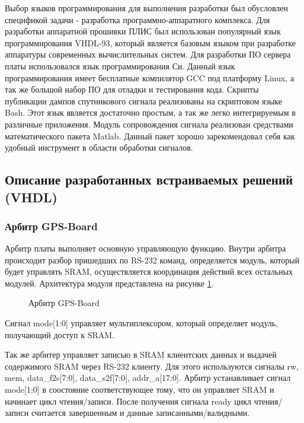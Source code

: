 Выбор языков программирования для выполнения разработки был обусловлен спецификой задачи - разработка программно-аппаратного комплекса.
Для разработки аппаратной прошивки ПЛИС был использован популярный язык программирования VHDL-93, который является базовым языком
при разработке аппаратуры современных вычислительных систем. Для разработки ПО сервера платы использовался язык программирования Си.
Данный язык программирования имеет бесплатные компилятор GCC под платформу Linux, а так же большой набор ПО для отладки и тестирования кода.
Скрипты публикации дампов спутникового сигнала реализованы на скриптовом языке Bash. Этот язык является достаточно простым, а так же
легко интегрируемым в различные приложения.
Модуль сопровождения сигнала реализован средствами математического пакета Matlab. Данный пакет хорошо зарекомендовал себя как удобный инструмент
в области обработки сигналов.

\subsection{Описание разработанных встраиваемых решений (VHDL)}
\subsubsection*{Арбитр GPS-Board}
Арбитр платы выполняет основную управляющую функцию. Внутри арбитра происходит разбор пришедших по RS-232 команд, определяется
модуль, который будет управлять SRAM, осуществляется координация действий всех остальных модулей. Архитектура модуля представлена на
рисунке \ref{pic:arbiter_arch}.

\begin{figure}[h]
\begin{center}
\end{center}
\caption{Арбитр GPS-Board}
\label{pic:arbiter_arch}
\end{figure}

Сигнал mode[1:0] управляет мультиплексором, который определяет модуль, получающий доступ к SRAM. 

Так же арбитер управляет записью в SRAM клиентских данных и выдачей содержимого SRAM через RS-232 клиенту. Для этого используются
сигналы rw, mem, data\_f2s[7:0], data\_s2f[7:0], addr\_a[17:0]. Арбитр устанавливает сигнал mode[1:0] в соостояние соответствующее
тому, что он управляет SRAM и начинает цикл чтения/записи. После получения сигнала ready цикл чтения/записи считается завершенным
и данные записанными/валидными.

